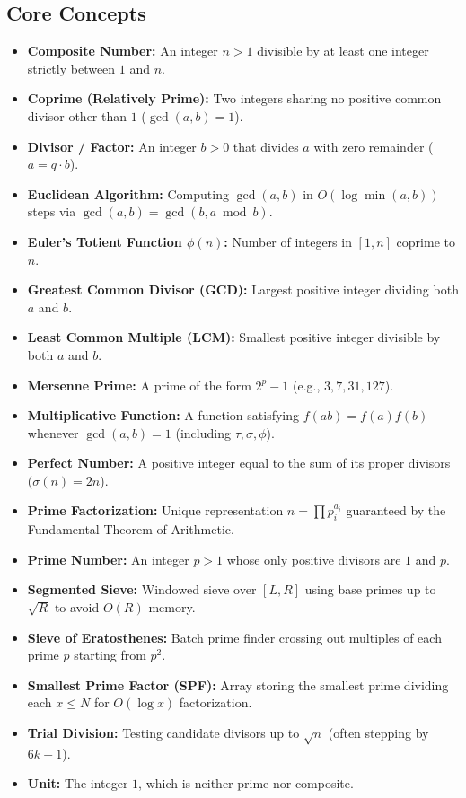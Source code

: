 \documentclass[11pt,a4paper]{article}
\theoremstyle{definition}
\begin{document}
\subsection*{Core Concepts}
\begin{itemize}[itemsep=1.5pt, topsep=2pt]
    \item \textbf{Composite Number:} An integer $n > 1$ divisible by at least one integer strictly between $1$ and $n$.
    \item \textbf{Coprime (Relatively Prime):} Two integers sharing no positive common divisor other than $1$ ($\gcd(a, b) = 1$).
    \item \textbf{Divisor / Factor:} An integer $b > 0$ that divides $a$ with zero remainder ($a = q \cdot b$).
    \item \textbf{Euclidean Algorithm:} Computing $\gcd(a, b)$ in $O(\log \min(a, b))$ steps via $\gcd(a, b) = \gcd(b, a \bmod b)$.
    \item \textbf{Euler's Totient Function $\phi(n)$:} Number of integers in $[1, n]$ coprime to $n$.
    \item \textbf{Greatest Common Divisor (GCD):} Largest positive integer dividing both $a$ and $b$.
    \item \textbf{Least Common Multiple (LCM):} Smallest positive integer divisible by both $a$ and $b$.
    \item \textbf{Mersenne Prime:} A prime of the form $2^p - 1$ (e.g., $3, 7, 31, 127$).
    \item \textbf{Multiplicative Function:} A function satisfying $f(ab) = f(a)f(b)$ whenever $\gcd(a, b) = 1$ (including $\tau, \sigma, \phi$).
    \item \textbf{Perfect Number:} A positive integer equal to the sum of its proper divisors ($\sigma(n) = 2n$).
    \item \textbf{Prime Factorization:} Unique representation $n = \prod p_i^{a_i}$ guaranteed by the Fundamental Theorem of Arithmetic.
    \item \textbf{Prime Number:} An integer $p > 1$ whose only positive divisors are $1$ and $p$.
    \item \textbf{Segmented Sieve:} Windowed sieve over $[L, R]$ using base primes up to $\sqrt{R}$ to avoid $O(R)$ memory.
    \item \textbf{Sieve of Eratosthenes:} Batch prime finder crossing out multiples of each prime $p$ starting from $p^2$.
    \item \textbf{Smallest Prime Factor (SPF):} Array storing the smallest prime dividing each $x \le N$ for $O(\log x)$ factorization.
    \item \textbf{Trial Division:} Testing candidate divisors up to $\sqrt{n}$ (often stepping by $6k \pm 1$).
    \item \textbf{Unit:} The integer $1$, which is neither prime nor composite.
\end{itemize}
\end{document}
